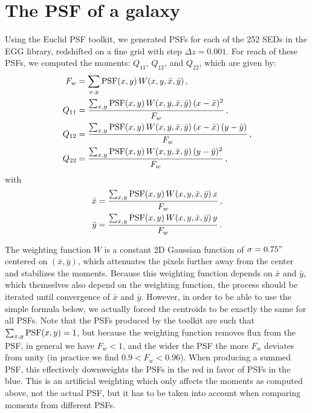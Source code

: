 \documentclass[11pt,a4paper]{article}
\numberwithin{equation}{section}
\begin{document}
\section{The PSF of a galaxy}

Using the Euclid PSF toolkit, we generated PSFs for each of the 252 SEDs in the EGG library, redshifted on a fine grid with step $\Delta z = 0.001$. For reach of these PSFs, we computed the moments: $Q_{11}$, $Q_{12}$, and $Q_{22}$, which are given by:
\begin{align}
F_w &= \sum_{x, y} {\rm PSF}(x,y)\,W(x,y,\bar{x},\bar{y})\,, \\
Q_{11} &= \frac{\sum_{x, y} {\rm PSF}(x,y)\,W(x,y,\bar{x},\bar{y})\,(x - \bar{x})^2}{F_w}\,, \\
Q_{12} &= \frac{\sum_{x, y} {\rm PSF}(x,y)\,W(x,y,\bar{x},\bar{y})\,(x - \bar{x})\,(y - \bar{y})}{F_w}\,, \\
Q_{22} &= \frac{\sum_{x, y} {\rm PSF}(x,y)\,W(x,y,\bar{x},\bar{y})\,(y - \bar{y})^2}{F_w}\,, \\
\end{align}
with
\begin{align}
\bar{x} &= \frac{\sum_{x, y} {\rm PSF}(x,y)\,W(x,y,\bar{x},\bar{y})\,x}{F_w}\,, \\
\bar{y} &= \frac{\sum_{x, y} {\rm PSF}(x,y)\,W(x,y,\bar{x},\bar{y})\,y}{F_w}\,.
\end{align}

The weighting function $W$ is a constant 2D Gaussian function of $\sigma=0.75"$ centered on $(\bar{x}, \bar{y})$, which attenuates the pixels further away from the center and stabilizes the moments. Because this weighting function depends on $\bar{x}$ and $\bar{y}$, which themselves also depend on the weighting function, the process should be iterated until convergence of $\bar{x}$ and $\bar{y}$. However, in order to be able to use the simple formula below, we actually forced the centroids to be exactly the same for all PSFs. Note that the PSFs produced by the toolkit are such that $\sum_{x,y}{\rm PSF}(x,y) = 1$, but because the weighting function removes flux from the PSF, in general we have $F_w < 1$, and the wider the PSF the more $F_w$ deviates from unity (in practice we find $0.9<F_w<0.96$). When producing a summed PSF, this effectively downweights the PSFs in the red in favor of PSFs in the blue. This is an artificial weighting which only affects the moments as computed above, not the actual PSF, but it has to be taken into account when comparing moments from different PSFs.
\end{document}

